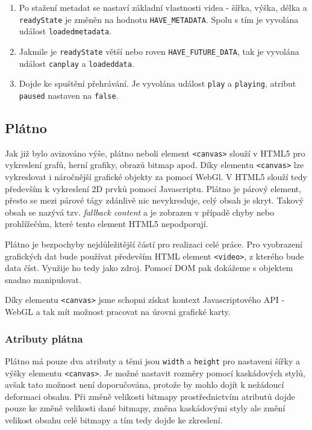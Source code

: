 \begin{description}
\begin{enumerate}
			\item Po stažení metadat se nastaví základní vlastnosti videa - šířka, výška, délka a \texttt{readyState} je změněn na hodnotu \texttt{HAVE\_METADATA}. Spolu s tím je vyvolána událost \texttt{loadedmetadata}.
			
			\item Jakmile je \texttt{readyState} větší nebo roven \texttt{HAVE\_FUTURE\_DATA}, tak je vyvolána událost \texttt{canplay} a \texttt{loadeddata}.
			
			\item Dojde ke spuštění přehrávání. Je vyvolána událost \texttt{play} a \texttt{playing}, atribut \texttt{paused} nastaven na \texttt{false}.
		\end{enumerate}
\end{description}


\newpage

\subsection{Plátno}

Jak již bylo avizováno výše, plátno neboli element \texttt{<canvas>} slouží v HTML5 pro vykreslení grafů, herní grafiky, obrazů bitmap apod. Díky elementu \texttt{<canvas>} lze vykreslovat i náročnější grafické objekty za pomocí WebGl. \cite{HTML5_CZNIC} V HTML5 slouží tedy především k vykreslení 2D prvků pomocí Javascriptu. Plátno je párový  element, přesto se mezi párové tágy zdánlivě nic nevykresluje, celý obsah je skryt. Takový obsah se nazývá tzv. \textit{fallback content} a je zobrazen v případě chyby nebo prohlížečům, které tento element HTML5 nepodporují.

Plátno je bezpochyby nejdůležitější částí pro realizaci celé práce. Pro  vyobrazení grafických dat bude používat především HTML element \texttt{<video>}, z kterého bude data číst. Využije ho tedy jako zdroj. \cite{HTML5aCSS3} Pomocí DOM pak dokážeme s objektem snadno manipulovat. 

Díky elementu \texttt{<canvas>} jsme schopni získat kontext Javascriptového API - WebGL a tak mít možnost  pracovat na úrovni grafické karty.


\subsubsection*{Atributy plátna}
Plátno má pouze dva atributy a těmi jsou \texttt{width} a \texttt{height} pro nastaveni šířky a výšky elementu \texttt{<canvas>}. Je možné nastavit rozměry pomocí kaskádových stylů, avšak tato možnost není doporučována, protože by mohlo dojít k nežádoucí deformaci obsahu. Při změně velikosti bitmapy prostřednictvím atributů dojde pouze ke změně velikosti dané bitmapy, změna kaskádovými styly ale změní velikost obsahu celé bitmapy a tím tedy dojde ke zkreslení.


